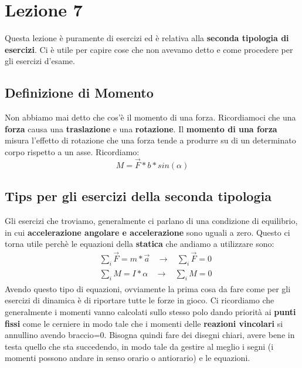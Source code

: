 \documentclass{article}
\numberwithin{equation}{subsection}
\begin{document}
\section{Lezione 7}
Questa lezione è puramente di esercizi ed è relativa alla \textbf{seconda tipologia di esercizi}. Ci è utile per capire cose che non avevamo detto e come procedere per gli esercizi d'esame.
\subsection{Definizione di Momento}
Non abbiamo mai detto che cos'è il momento di una forza. Ricordiamoci che una \textbf{forza} causa una \textbf{traslazione} e una \textbf{rotazione}. Il \textbf{momento di una forza} misura l'effetto di rotazione che una forza tende a produrre su di un determinato corpo rispetto a un asse. Ricordiamo:
\begin{equation}
    M=\vec{F}*b*sin(\alpha)
\end{equation}
\subsection{Tips per gli esercizi della seconda tipologia}
Gli esercizi che troviamo, generalmente ci parlano di una condizione di equilibrio, in cui \textbf{accelerazione angolare e accelerazione} sono uguali a zero. Questo ci torna utile perchè le equazioni della \textbf{statica} che andiamo a utilizzare sono:
\begin{align}
    & \sum_i\vec{F}=m*\vec{a} \ \ \ \ \xrightarrow[]{} \ \ \ \ \sum_i\vec{F}=0 \\
    & \sum_iM=I*\alpha \ \ \ \ \xrightarrow[]{} \ \ \ \ \sum_iM=0 
\end{align}
Avendo questo tipo di equazioni, ovviamente la prima cosa da fare come per gli esercizi di dinamica è di riportare tutte le forze in gioco. Ci ricordiamo che generalmente i momenti vanno calcolati sullo stesso polo dando priorità ai \textbf{punti fissi} come le cerniere in modo tale che i momenti delle \textbf{reazioni vincolari} si annullino avendo braccio=0. Bisogna quindi fare dei disegni chiari, avere bene in testa quello che sta succedendo, in modo tale da gestire al meglio i segni (i momenti possono andare in senso orario o antiorario) e le equazioni.
\end{document}
